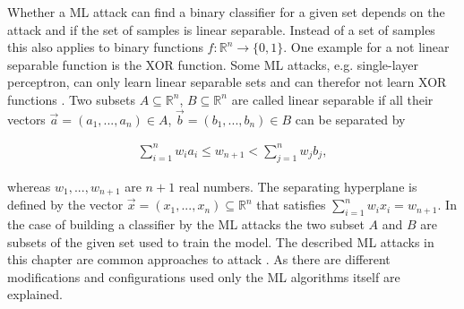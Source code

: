 Whether a \ac{ML} attack can find a binary classifier for a given set depends on the attack and if the set of samples is linear separable. 
Instead of a set of samples this also applies to binary functions $f: \mathbb{R}^n \to \{0,1\}$. %
One example for a not linear separable function is the \ac{XOR} function. %
Some \ac{ML} attacks, e.g. single-layer perceptron, can only learn linear separable sets and can therefor not learn \ac{XOR} functions \cite{Minsky1969Perceptrons:Geometry}. %
Two subsets $A \subseteq \mathbb{R}^n$, $B \subseteq \mathbb{R}^n$ are called linear separable if all their vectors $\vec{a} = (a_1, ..., a_n) \in A$, $\vec{b} = (b_1, ..., b_n) \in B$ can be separated by

\begin{align}
\sum_{i=1}^{n} w_i a_i \le w_{n + 1} < \sum_{j=1}^{n} w_j b_j, \label{equ:linearseparable}
\end{align}

whereas $w_1, ..., w_{n + 1}$ are $n + 1$ real numbers.
The separating hyperplane is defined by the vector $\vec{x} = (x_1, ..., x_n) \subseteq \mathbb{R}^n$ that satisfies $\sum_{i = 1}^{n} w_i x_i = w_{n + 1}$.%
In the case of building a classifier by the \ac{ML} attacks the two subset $A$ and $B$ are subsets of the given set used to train the model. %
The described \ac{ML} attacks in this chapter are common approaches to attack \pufs \cite{Ruhrmair2014PUFOverview}.
As there are different modifications and configurations used only the \ac{ML} algorithms itself are explained.

% 
% 
% 

